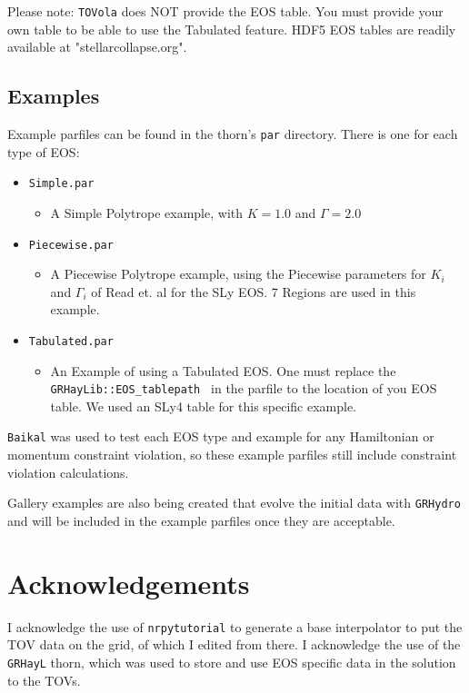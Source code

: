 Please note: \texttt{TOVola} does NOT provide the EOS table. You must provide your own table to be able to use the Tabulated feature. HDF5 EOS tables are readily available at "stellarcollapse.org".

\subsection{Examples}

Example parfiles can be found in the thorn's \texttt{par} directory. There is one for each type of EOS:

\begin{itemize}
    \item \texttt{Simple.par }
    \begin{itemize}
    \item A Simple Polytrope example, with $K=1.0$ and $\Gamma=2.0$
    \end{itemize}
    \item \texttt{Piecewise.par }
    \begin{itemize}
    \item A Piecewise Polytrope example, using the Piecewise parameters for $K_i$ and $\Gamma_i$ of Read et. al for the SLy EOS.\cite{TOVola_TOVola_Read} 7 Regions are used in this example.
    \end{itemize}
    \item \texttt{Tabulated.par }
    \begin{itemize}
	    \item An Example of using a Tabulated EOS. One must replace the \texttt{GRHayLib::EOS\_tablepath } in the parfile to the location of you EOS table. We used an SLy4 table for this specific example.
    \end{itemize}
\end{itemize}

\texttt{Baikal} was used to test each EOS type and example for any Hamiltonian or momentum constraint violation, so these example parfiles still include constraint violation calculations.

Gallery examples are also being created that evolve the initial data with \texttt{GRHydro} and will be included in the example parfiles once they are acceptable.

\section{Acknowledgements}

I acknowledge the use of \texttt{nrpytutorial}\cite{TOVola_TOVola_NRpy} to generate a base interpolator to put the TOV data on the grid, of which I edited from there. I acknowledge the use of the \texttt{GRHayL} thorn, which was used to store and use EOS specific data in the solution to the TOVs.

